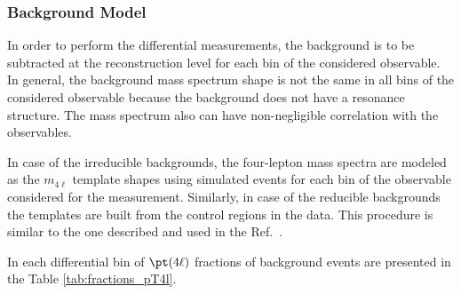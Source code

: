 \subsubsection{Background Model} \label{sec:BackgroundDifferential}
In order to perform the differential measurements, the background is to be subtracted at the reconstruction level for each bin
of the considered observable.
In general, the background mass spectrum shape is not the same in all bins of the considered observable because the background does not have a resonance
structure. The mass spectrum also can have non-negligible correlation with the observables. 
\par 
In case of the irreducible backgrounds, the four-lepton mass spectra are modeled as the $m_{4\ell}$ template shapes using simulated events
for each bin of the observable considered for the measurement. Similarly, in case of the reducible backgrounds the templates are built from the control 
regions in the data. This procedure is similar to the one described and used in the Ref.~\cite{Chatrchyan:2013mxa}.
\par 
In each differential bin of $\pt(4\ell)$ fractions of background events are presented in the Table \ref{tab:fractions_pT4l}. 


